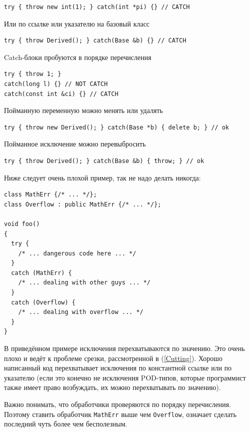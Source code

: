 \documentclass[a4paper,12pt,oneside]{book}
\begin{document}
\begin{lstlisting}
try { throw new int(1); } catch(int *pi) {} // CATCH
\end{lstlisting}

Или по ссылке или указателю на базовый класс

\begin{lstlisting}
try { throw Derived(); } catch(Base &b) {} // CATCH
\end{lstlisting}

Catch-блоки пробуются в порядке перечисления

\begin{lstlisting}
try { throw 1; }
catch(long l) {} // NOT CATCH
catch(const int &ci) {} // CATCH
\end{lstlisting}

Пойманную переменную можно менять или удалять

\begin{lstlisting}
try { throw new Derived(); } catch(Base *b) { delete b; } // ok
\end{lstlisting}

Пойманное исключение можно перевыбросить

\begin{lstlisting}
try { throw Derived(); } catch(Base &b) { throw; } // ok
\end{lstlisting}

Ниже следует очень плохой пример, так не надо делать никогда:

\begin{lstlisting}
class MathErr {/* ... */};
class Overflow : public MathErr {/* ... */};

void foo()
{
  try {
    /* ... dangerous code here ... */
  }
  catch (MathErr) {
    /* ... dealing with other guys ... */
  }
  catch (Overflow) {
    /* ... dealing with overflow ... */
  }
}
\end{lstlisting}

В приведённом примере исключения перехватываются по значению. Это очень плохо и ведёт к проблеме срезки, рассмотренной в (\ref{Cutting}). Хорошо написанный код перехватывает исключения по константной ссылке или по указателю (если это конечно не исключения POD-типов, которые программист также имеет право возбуждать, их можно перехватывать по значению).

Важно понимать, что обработчики проверяются по порядку перечисления. Поэтому ставить обработчик \lstinline!MathErr! выше чем \lstinline!Overflow!, означает сделать последний чуть более чем бесполезным.
\end{document}
